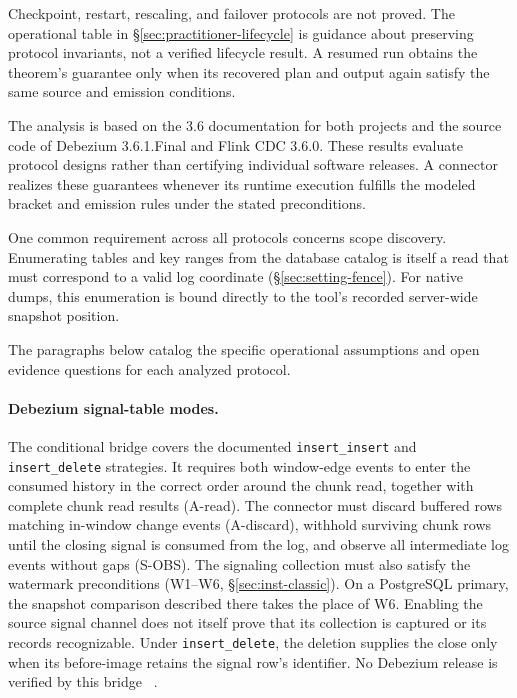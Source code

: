\documentclass[sigconf,nonacm,10pt]{acmart}
\theoremstyle{plain}
\theoremstyle{definition}
\begin{document}
Checkpoint, restart, rescaling, and failover protocols are not proved.
The operational table in \S\ref{sec:practitioner-lifecycle} is guidance
about preserving protocol invariants, not a verified lifecycle result. A 
resumed run obtains the theorem's guarantee only when its recovered plan
and output again satisfy the same source and emission conditions.

The analysis is based on the 3.6 documentation for both projects and the
source code of Debezium 3.6.1.Final and Flink CDC 3.6.0. These results evaluate protocol
designs rather than certifying individual software releases. A connector realizes these 
guarantees whenever its runtime execution fulfills the modeled bracket and emission rules 
under the stated preconditions.

One common requirement across all protocols concerns scope discovery. Enumerating 
tables and key ranges from the database catalog is itself a read that must correspond to a valid log 
coordinate (\S\ref{sec:setting-fence}). For native dumps, this enumeration is bound directly to the tool's 
recorded server-wide snapshot position.

The paragraphs below catalog the specific operational assumptions and open evidence questions 
for each analyzed protocol.

\paragraph{Debezium signal-table modes.}
The conditional bridge covers the documented \texttt{insert\_insert}
and \texttt{insert\_delete} strategies. It requires both window-edge
events to enter the consumed history in the correct order around the
chunk read, together with complete chunk read results (A-read). 
The connector must discard buffered rows matching in-window change events 
(A-discard), withhold surviving chunk rows until the closing signal is consumed 
from the log, and observe all intermediate log events without gaps (S-OBS). 
The signaling collection must also satisfy the watermark
preconditions (W1--W6, \S\ref{sec:inst-classic}). On a PostgreSQL primary,
the snapshot comparison described there takes the place of W6. Enabling the
source signal channel does not itself prove that its collection is
captured or its records recognizable. Under \texttt{insert\_delete},
the deletion supplies the close only when its before-image retains the
signal row's identifier. No Debezium release is verified by this bridge
~\cite{debezium_signalling,debezium_mysql_connector,debezium_signal_delete_source}.
\end{document}
